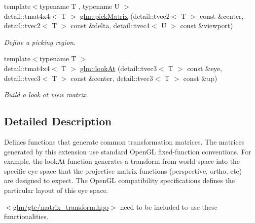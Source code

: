 \begin{DoxyCompactItemize}
{\footnotesize template$<$typename T , typename U $>$ }\\detail\-::tmat4x4$<$ T $>$ \hyperlink{group__gtc__matrix__transform_gaf711e3351e368706876106bc64673a91}{glm\-::pick\-Matrix} (detail\-::tvec2$<$ T $>$ const \&center, detail\-::tvec2$<$ T $>$ const \&delta, detail\-::tvec4$<$ U $>$ const \&viewport)
\begin{DoxyCompactList}\small\item\em Define a picking region. \end{DoxyCompactList}\item 
{\footnotesize template$<$typename T $>$ }\\detail\-::tmat4x4$<$ T $>$ \hyperlink{group__gtc__matrix__transform_gae2dca3785b6d5796e876114af58a60a1}{glm\-::look\-At} (detail\-::tvec3$<$ T $>$ const \&eye, detail\-::tvec3$<$ T $>$ const \&center, detail\-::tvec3$<$ T $>$ const \&up)
\begin{DoxyCompactList}\small\item\em Build a look at view matrix. \end{DoxyCompactList}\end{DoxyCompactItemize}


\subsection{Detailed Description}
Defines functions that generate common transformation matrices. The matrices generated by this extension use standard Open\-G\-L fixed-\/function conventions. For example, the look\-At function generates a transform from world space into the specific eye space that the projective matrix functions (perspective, ortho, etc) are designed to expect. The Open\-G\-L compatibility specifications defines the particular layout of this eye space.

$<$\hyperlink{matrix__transform_8hpp}{glm/gtc/matrix\-\_\-transform.\-hpp}$>$ need to be included to use these functionalities. 

